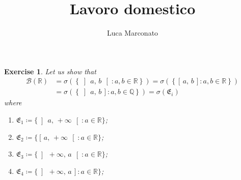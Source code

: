 \documentclass[12pt,a4paper]{article} %
\title{Lavoro domestico}
\author{Luca Marconato}
\theoremstyle{plain}
\newtheorem{exercise}{Exercise}
\newcommand\E{\ensuremath{\mathfrak E}}                               %
\newcommand\Q{\ensuremath{\mathbb Q}}                                 %
\newcommand\st{\colon}                                                %
\newcommand\icc[2]{\ensuremath{\left[\,#1,\,#2\,\right]}}
\newcommand\ico[2]{\ensuremath{\left[\,#1,\,#2\,\right[}}
\newcommand\ioc[2]{\ensuremath{\left]\,#1,\,#2\,\right]}}
\newcommand\ioo[2]{\ensuremath{\left]\,#1,\,#2\,\right[}}
\begin{document}
\maketitle
\begin{exercise}
  Let us show that
  \begin{subequations}
    \begin{align}    
      \mathcal{B} (\mathbb{R}) & = \sigma \left(\left\{ \ioo{a}{b} \st a, b \in \mathbb{R} \right\} \right) = \sigma \left(\left\{\icc{a}{b} \st a, b \in \mathbb{R} \right\}\right) \\
      & = \sigma \left(\left\{\ioc{a}{b} \st a, b \in \Q \right\}\right) = \sigma (\E_i)
    \end{align}
  \end{subequations}
  where
  \begin{enumerate}
    \item $\E_{1}\coloneqq \{\ioo{a}{+\infty} \st a \in \mathbb{R}\}$;
    \item $\E_{2}\coloneqq \{\ico{a}{+\infty} \st a \in \mathbb{R}\}$;
    \item $\E_{3}\coloneqq \{\ioo{+\infty}{a} \st a \in \mathbb{R}\}$;
    \item $\E_{4}\coloneqq \{\ioc{+\infty}{a} \st a \in \mathbb{R}\}$;
  \end{enumerate}
\end{exercise}
\end{document}
